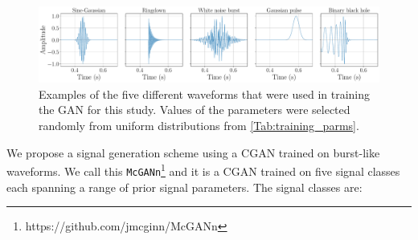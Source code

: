 \documentclass[12pt]{iopart}
\begin{document}
%
\begin{figure}
    \centering
    \showthe\textwidth
    \includegraphics[width=\textwidth]{figures/training-sample.pdf}
    \caption{Examples of the five different waveforms that were used in training the \ac{GAN} for this study. Values of the parameters were selected randomly from uniform distributions from \cref{Tab:training_parms}.}
    \label{fig:training_waveforms}
\end{figure}
%
We propose a signal generation scheme using a \ac{CGAN} trained on burst-like waveforms. We call this \texttt{McGANn}\footnote{https://github.com/jmcginn/McGANn} and it is a \ac{CGAN} trained on five signal classes each spanning a range of prior signal parameters. The signal classes are:
\end{document}

